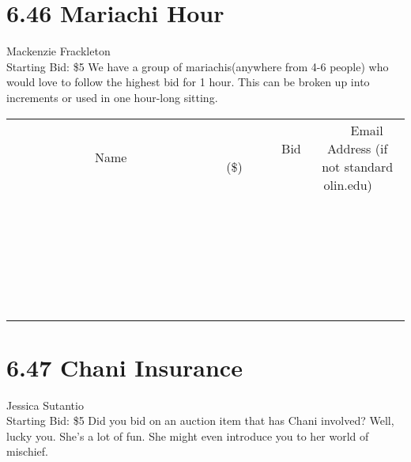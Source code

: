 \documentclass[11pt]{article}
\begin{document}
\section*{6.46 Mariachi Hour}
Mackenzie Frackleton
\\
Starting Bid: \$5
\newline
We have a group of mariachis(anywhere from 4-6 people) who would love to follow the highest bid for 1 hour. This can be broken up into increments or used in one hour-long sitting.
\\[6ex]
\begin{tabular}{c c c}
~~~~~~~~~~~~~Name~~~~~~~~~~~~~ & ~~~~~~~~~Bid (\$)~~~~~~~~~  & ~~~Email Address (if not standard olin.edu)~~~\\
 & & \\
\hline
 & & \\
\hline
 & & \\
\hline
 & & \\
\hline
 & & \\
\hline
 & & \\
\hline
 & & \\
\hline
 & & \\
\hline
 & & \\
\hline
 & & \\
\hline
 & & \\
\hline
 & & \\
\hline
 & & \\
\hline
 & & \\
\hline
 & & \\
\hline
 & & \\
\hline
 & & \\
\hline
 & & \\
\hline
 & & \\
\hline
 & & \\
\hline
 & & \\
\hline
 & & \\
\hline
 & & \\
\hline
 & & \\
\hline
 & & \\
\hline
 & & \\
\hline
\end{tabular}
\newpage
\section*{6.47 Chani Insurance}
Jessica Sutantio
\\
Starting Bid: \$5
\newline
Did you bid on an auction item that has Chani involved? Well, lucky you. She's a lot of fun. She might even introduce you to her world of mischief.
\end{document}
